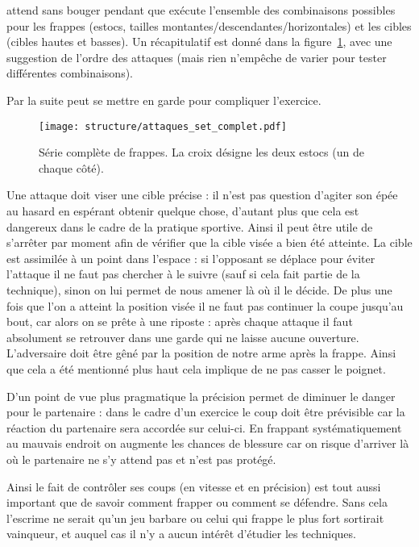 \begin{exercice}


\D attend sans bouger pendant que \A exécute l'ensemble des combinaisons possibles pour les frappes (estocs, tailles montantes/descendantes/horizontales) et les cibles (cibles hautes et basses).
Un récapitulatif est donné dans la figure~\ref{att:fig:série-complète}, avec une suggestion de l'ordre des attaques (mais rien n'empêche de varier pour tester différentes combinaisons).

Par la suite \D peut se mettre en garde pour compliquer l'exercice.
\end{exercice}


\begin{figure}[ht]
	\centering
	\texttt{[image: structure/attaques\_set\_complet.pdf]}
	\caption{Série complète de frappes.
	La croix désigne les deux estocs (un de chaque côté).}
	\label{att:fig:série-complète}
\end{figure}


Une attaque doit viser une cible précise : il n'est pas question d'agiter son épée au hasard en espérant obtenir quelque chose, d'autant plus que cela est dangereux dans le cadre de la pratique sportive.
Ainsi il peut être utile de s'arrêter par moment afin de vérifier que la cible visée a bien été atteinte.
La cible est assimilée à un point dans l'espace : si l'opposant se déplace pour éviter l'attaque il ne faut pas chercher à le suivre (sauf si cela fait partie de la technique), sinon on lui permet de nous amener là où il le décide.
De plus une fois que l'on a atteint la position visée il ne faut pas continuer la coupe jusqu'au bout, car alors on se prête à une riposte : après chaque attaque il faut absolument se retrouver dans une garde qui ne laisse aucune ouverture.
L'adversaire doit être gêné par la position de notre arme après la frappe.
Ainsi que cela a été mentionné plus haut cela implique de ne pas casser le poignet.

D'un point de vue plus pragmatique la précision permet de diminuer le danger pour le partenaire : dans le cadre d'un exercice le coup doit être prévisible car la réaction du partenaire sera accordée sur celui-ci.
En frappant systématiquement au mauvais endroit on augmente les chances de blessure car on risque d'arriver là où le partenaire ne s'y attend pas et n'est pas protégé.

Ainsi le fait de contrôler ses coups (en vitesse et en précision) est tout aussi important que de savoir comment frapper ou comment se défendre.
Sans cela l'escrime ne serait qu'un jeu barbare ou celui qui frappe le plus fort sortirait vainqueur, et auquel cas il n'y a aucun intérêt d'étudier les techniques.


